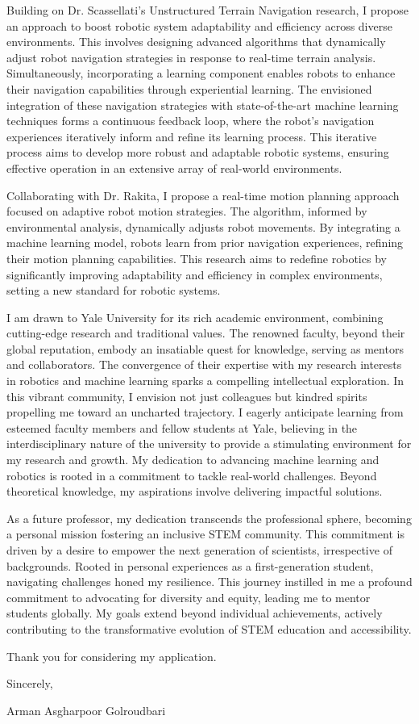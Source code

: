 \documentclass[a4,20pt]{article}
\begin{document}
\begin{large}
Building on Dr. Scassellati's Unstructured Terrain Navigation research, I propose an approach to boost robotic system adaptability and efficiency across diverse environments. This involves designing advanced algorithms that dynamically adjust robot navigation strategies in response to real-time terrain analysis. Simultaneously, incorporating a learning component enables robots to enhance their navigation capabilities through experiential learning. The envisioned integration of these navigation strategies with state-of-the-art machine learning techniques forms a continuous feedback loop, where the robot's navigation experiences iteratively inform and refine its learning process. This iterative process aims to develop more robust and adaptable robotic systems, ensuring effective operation in an extensive array of real-world environments.

Collaborating with Dr. Rakita, I propose a real-time motion planning approach focused on adaptive robot motion strategies. The algorithm, informed by environmental analysis, dynamically adjusts robot movements. By integrating a machine learning model, robots learn from prior navigation experiences, refining their motion planning capabilities. This research aims to redefine robotics by significantly improving adaptability and efficiency in complex environments, setting a new standard for robotic systems.


I am drawn to Yale University for its rich academic environment, combining cutting-edge research and traditional values. The renowned faculty, beyond their global reputation, embody an insatiable quest for knowledge, serving as mentors and collaborators. The convergence of their expertise with my research interests in robotics and machine learning sparks a compelling intellectual exploration. In this vibrant community, I envision not just colleagues but kindred spirits propelling me toward an uncharted trajectory. I eagerly anticipate learning from esteemed faculty members and fellow students at Yale, believing in the interdisciplinary nature of the university to provide a stimulating environment for my research and growth. My dedication to advancing machine learning and robotics is rooted in a commitment to tackle real-world challenges. Beyond theoretical knowledge, my aspirations involve delivering impactful solutions. 

As a future professor, my dedication transcends the professional sphere, becoming a personal mission fostering an inclusive STEM community. This commitment is driven by a desire to empower the next generation of scientists, irrespective of backgrounds. Rooted in personal experiences as a first-generation student, navigating challenges honed my resilience. This journey instilled in me a profound commitment to advocating for diversity and equity, leading me to mentor students globally. My goals extend beyond individual achievements, actively contributing to the transformative evolution of STEM education and accessibility.

\vspace{0.15cm}
Thank you for considering my application.\vspace{-0.1cm}

Sincerely, \vspace{-0.1cm}

Arman Asgharpoor Golroudbari


\end{large}
\end{document}
